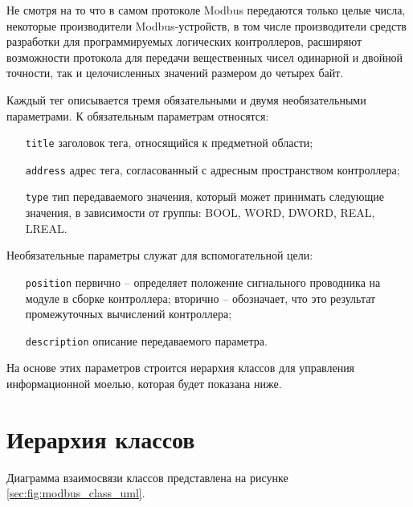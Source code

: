 Не смотря на то что в самом протоколе Modbus передаются только целые числа, некоторые производители Modbus-устройств,
в том числе производители средств разработки для программируемых логических контроллеров, расширяют возможности протокола
для передачи вещественных чисел одинарной и двойной точности, так и целочисленных значений размером до четырех байт.

Каждый тег описывается тремя обязательными и двумя необязательными параметрами.
К обязательным параметрам относятся:
\begin{itemize}
    \item[\texttt{title}] заголовок тега, относящийся к предметной области;
    \item[\texttt{address}] адрес тега, согласованный с адресным пространством контроллера;
    \item[\texttt{type}] тип передаваемого значения, который может принимать следующие значения, в зависимости от группы: BOOL, WORD, DWORD, REAL, LREAL.  
\end{itemize}
Необязательные параметры служат для вспомогательной цели:
\begin{itemize}
    \item[\texttt{position}] первично -- определяет положение сигнального проводника на модуле в сборке контроллера;
    вторично -- обозначает, что это результат промежуточных вычислений контроллера;
    \item[\texttt{description}] описание передаваемого параметра.
\end{itemize}

На основе этих параметров строится иерархия классов для управления информационной моелью, которая будет показана ниже.

\section{Иерархия классов}


Диаграмма взаимосвязи классов представлена на рисунке \ref{sec:fig:modbus_class_uml}. 


